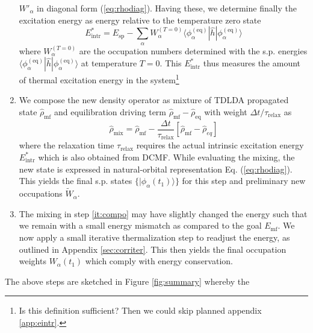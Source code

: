\documentclass[final,1p]{elsarticle}
\newcommand{\PGRfoot}[1]{{\color{blue}\footnote{\color{blue} #1}}}
\begin{document}
\begin{enumerate}
     $W'_\alpha$ in diagonal form (\ref{eq:rhodiag}).
     Having these, we determine finally the excitation energy
     as energy relative to the temperature zero state
     \begin{equation}
        E^*_\mathrm{intr}
        =
        E_\mathrm{sp}
        -
        \sum_\alpha W_\alpha^{(T=0)}
        \langle\phi_\alpha^\mathrm{(eq)}|\hat{h}|\phi_\alpha^\mathrm{(eq)}\rangle
     \label{eq:Estar}
     \end{equation}
     where $W_\alpha^{(T=0)}$ are the occupation numbers determined
     with the s.p. energies
     $\langle\phi_\alpha^\mathrm{(eq)}|\hat{h}|\phi_\alpha^\mathrm{(eq)}\rangle$
     at temperature $T=0$. This $E^*_\mathrm{intr}$ thus measures the
     amount of thermal excitation energy in the
     system\PGRfoot{Is this definition sufficient? Then we
         could skip planned appendix \ref{app:eintr}.}
   \item \label{it:compo} We compose the new density operator as mixture
     of TDLDA propagated state $\hat{\rho}_\mathrm{mf}$ and
     equilibration driving term
     $\hat{\rho}_\mathrm{mf}-\hat{\rho}_\mathrm{eq}$ with
     weight $\Delta t/\tau_\mathrm{relax}$ as
     \begin{equation*}
        \hat{\rho}_\mathrm{mix}
        = 
        \hat{\rho}_\mathrm{mf} -
        \frac{\Delta t}{\tau_\mathrm{relax}}
        \left[\hat{\rho}_\mathrm{mf}-\hat{\rho}_{eq}\right]
     \end{equation*}
     where the relaxation time $\tau_\mathrm{relax}$ requires the
     actual intrinsic excitation energy $E^*_\mathrm{intr}$ which is
     also obtained from DCMF.
     While evaluating the mixing, the new state is
     expressed in natural-orbital representation
     Eq. (\ref{eq:rhodiag}).  This yields the final s.p. states
     $\{|\phi_\alpha(t_1)\rangle\}$ for this step and
     preliminary new occupations $\tilde{W}_\alpha$.
   \item \label{it:therm} 
     The mixing in step \ref{it:compo} may have slightly changed
     the energy such that we remain with a small energy mismatch as
     compared to the goal $E_\mathrm{mf}$.  We now apply a small
     iterative thermalization step to readjust the energy, as outlined
     in Appendix \ref{sec:corriter}. This then yields the final
     occupation weights $W_\alpha(t_1)$ which comply with
     energy conservation.
\end{enumerate}
The above steps are sketched in Figure \ref{fig:summary} whereby the
\end{document}

